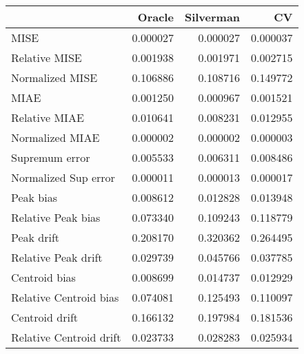 \begin{tabular}{lrrr}
  \toprule
 & Oracle & Silverman & CV \\ 
  \midrule
MISE & 0.000027 & 0.000027 & 0.000037 \\ 
  Relative MISE & 0.001938 & 0.001971 & 0.002715 \\ 
  Normalized MISE & 0.106886 & 0.108716 & 0.149772 \\ 
  MIAE & 0.001250 & 0.000967 & 0.001521 \\ 
  Relative MIAE & 0.010641 & 0.008231 & 0.012955 \\ 
  Normalized MIAE & 0.000002 & 0.000002 & 0.000003 \\ 
  Supremum error & 0.005533 & 0.006311 & 0.008486 \\ 
  Normalized Sup error & 0.000011 & 0.000013 & 0.000017 \\ 
  Peak bias & 0.008612 & 0.012828 & 0.013948 \\ 
  Relative Peak bias & 0.073340 & 0.109243 & 0.118779 \\ 
  Peak drift & 0.208170 & 0.320362 & 0.264495 \\ 
  Relative Peak drift & 0.029739 & 0.045766 & 0.037785 \\ 
  Centroid bias & 0.008699 & 0.014737 & 0.012929 \\ 
  Relative Centroid bias & 0.074081 & 0.125493 & 0.110097 \\ 
  Centroid drift & 0.166132 & 0.197984 & 0.181536 \\ 
  Relative Centroid drift & 0.023733 & 0.028283 & 0.025934 \\ 
   \bottomrule
\end{tabular}
